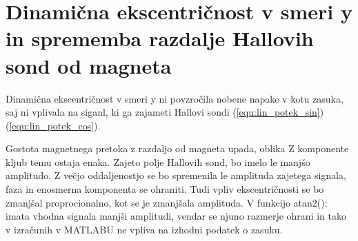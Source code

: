\section{Dinamična ekscentričnost v smeri y in sprememba razdalje Hallovih sond od magneta }
Dinamična ekscentričnost v smeri y ni povzročila nobene napake v kotu zasuka, saj ni vplivala na siganl, ki ga zajameti Hallovi sondi (\ref{equ:lin_potek_sin})(\ref{equ:lin_potek_cos}).

Gostota magnetnega pretoka z razdaljo od magneta upada, oblika Z komponente kljub temu ostaja enaka. Zajeto polje Hallovih sond, bo imelo le manjšo amplitudo. Z večjo oddaljenostjo se bo spremenila le amplituda zajetega signala, faza in enosmerna komponenta se ohraniti. Tudi vpliv ekscentričnosti se bo zmanjšal proprocionalno, kot se je zmanjšala amplituda. V funkcijo atan2(); imata vhodna signala manjši amplitudi, vendar se njuno razmerje ohrani in tako v izračunih v MATLABU ne vpliva na izhodni podatek o zasuku.